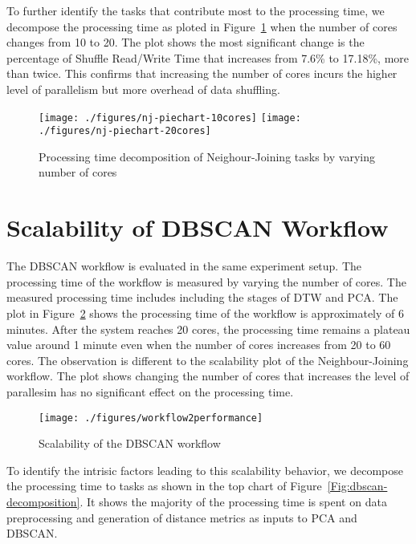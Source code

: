 To further identify the tasks that contribute most to the processing time, we decompose the processing time as ploted in Figure~\ref{Fig:nj-decomposition} when the number of cores changes from 10 to 20. The plot shows the most significant change is the percentage of \textsf{Shuffle Read/Write Time} that increases from 7.6\% to 17.18\%, more than twice.  This confirms that increasing the number of cores incurs the higher level of parallelism but more overhead of data shuffling. 


\begin{figure}
	\centering
	\texttt{[image: ./figures/nj-piechart-10cores]}
	\texttt{[image: ./figures/nj-piechart-20cores]}
	\caption{Processing time decomposition of Neighour-Joining tasks by varying number of cores}
	\label{Fig:nj-decomposition}
\end{figure}

\section{Scalability of DBSCAN Workflow}
The DBSCAN workflow is evaluated in the same experiment setup. The processing time of the workflow is measured by varying the number of cores. The measured processing time includes including the stages of DTW and PCA.  The plot in Figure~\ref{Fig:scalability-dbscan} shows 
the processing time of the workflow is approximately of 6 minutes. After the system reaches 20 cores, the processing time remains a plateau value around 1 minute even when the number of cores increases from 20 to 60 cores. The observation is different to the scalability plot of the Neighbour-Joining workflow. The plot shows changing the number of cores that increases the level of parallesim has no significant effect on the processing time.  

\begin{figure}
	\centering
	\texttt{[image: ./figures/workflow2performance]}
	\caption{Scalability of the DBSCAN workflow}
	\label{Fig:scalability-dbscan}
\end{figure}


To identify the intrisic factors leading to this scalability behavior, we decompose the processing time to tasks as shown in the top chart of Figure~\ref{Fig:dbscan-decomposition}. It shows the majority of the processing time is spent on data preprocessing and generation of distance metrics as inputs to PCA and DBSCAN. 

